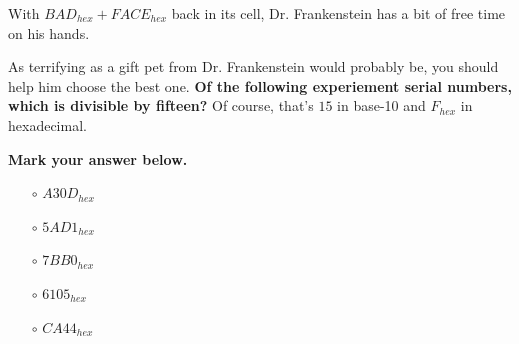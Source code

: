 


With \(BAD_{hex}+FACE_{hex}\) back in its cell, Dr. Frankenstein has a bit
of free time on his hands.

As terrifying as a gift pet from Dr. Frankenstein would probably be, you should
help him choose the best one. \textbf{Of the following experiement
serial numbers, which is divisible by fifteen?} Of course, that's
\(15\) in base-10 and \(F_{hex}\) in hexadecimal.


\vspace{2em}

\textbf{Mark your answer below.}

\begin{itemize}
  \item[\Huge\(\circ\)] \(A30D_{hex}\)
  \item[\Huge\(\circ\)] \(5AD1_{hex}\)
  \item[\Huge\(\circ\)] \(7BB0_{hex}\)
  \item[\Huge\(\circ\)] \(6105_{hex}\)
  \item[\Huge\(\circ\)] \(CA44_{hex}\)
\end{itemize}
